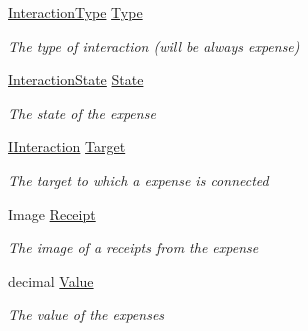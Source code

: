 \begin{DoxyCompactItemize}
\hyperlink{namespace_plex_byte_1_1_mo_cap_1_1_interactions_a6e7bea333446664bbce2bb296db25e31}{Interaction\+Type} \hyperlink{class_plex_byte_1_1_mo_cap_1_1_interactions_1_1_expense_a3152c1d7bf0ab00c5080ae1c6ff89b78}{Type}
\begin{DoxyCompactList}\small\item\em The type of interaction (will be always expense) \end{DoxyCompactList}\item 
\hyperlink{namespace_plex_byte_1_1_mo_cap_1_1_interactions_afcb673d9186608b6bd3b187179aedc8a}{Interaction\+State} \hyperlink{class_plex_byte_1_1_mo_cap_1_1_interactions_1_1_expense_a704e4d179a9908a8a53dfc578a73dedc}{State}
\begin{DoxyCompactList}\small\item\em The state of the expense \end{DoxyCompactList}\item 
\hyperlink{interface_plex_byte_1_1_mo_cap_1_1_interactions_1_1_i_interaction}{I\+Interaction} \hyperlink{class_plex_byte_1_1_mo_cap_1_1_interactions_1_1_expense_a6b8ec6c467734c6cfd85368ba289e886}{Target}
\begin{DoxyCompactList}\small\item\em The target to which a expense is connected \end{DoxyCompactList}\item 
Image \hyperlink{class_plex_byte_1_1_mo_cap_1_1_interactions_1_1_expense_acb73575488e1faae9d3fd270373c345b}{Receipt}
\begin{DoxyCompactList}\small\item\em The image of a receipts from the expense \end{DoxyCompactList}\item 
decimal \hyperlink{class_plex_byte_1_1_mo_cap_1_1_interactions_1_1_expense_a35cdb298490671c1386fef1f1af31f3b}{Value}
\begin{DoxyCompactList}\small\item\em The value of the expenses \end{DoxyCompactList}\item 

\end{DoxyCompactItemize}
